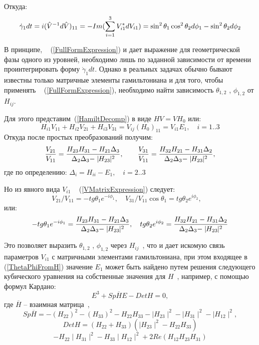 \documentclass[a4paper]{article}
\def\Vhat{ \ifmmode {\hat V} \else {$\hat V$} \fi}
\def\Vform{ \ifmmode {\Vhat^{-1}d\Vhat} \else {$\Vhat^{-1}d\Vhat$} \fi}
\def\cosT#1{\cos \theta_{#1}}
\def\mod#1{\mid\!\!#1\!\!\mid}
\begin{document}
Откуда:
\begin{equation}
  \dot \gamma_1 dt
   = i (\Vform)_{11}
   = - Im(\sum_{i=1}^{3} V^\ast_{i1} dV_{i1})
   = \sin^2\theta_1 \cos^2\theta_2 d\phi_1 -
                     \sin^2\theta_2 d\phi_2
  \label{FullFormExpression}
\end{equation}

В принципе, ~ (\ref{FullFormExpression}) и дает выражение для
геометрической фазы одного из уровней, необходимо лишь по заданной
зависимости \Vhat от времени проинтегрировать форму $\dot \gamma_1 dt$.
Однако в реальных
задачах обычно бывают известны только матричные элементы
гамильтониана и для того, чтобы применять ~ (\ref{FullFormExpression}),
необходимо найти зависимость $\theta_{1,2}$ , $\phi_{1,2}$ от $H_{ij}$.

Для этого представим~(\ref{HamiltDecomp}) в виде
$HV = VH_0$ или:
$$
  H_{i1}V_{11} + H_{i2}V_{21} + H_{i3}V_{31} = V_{ij}(H_0)_{11} = 
V_{i1}E_{1},
    \quad i = 1..3
$$
Откуда после простых преобразований получим:
$$
{V_{21} \over V_{11}} =
    {H_{23}H_{31} - H_{21} \Delta_3 \over \Delta_2 \Delta_3 - 
\mod{H_{23}}^2},
  \qquad
{V_{31} \over V_{11}} =
    {H_{32}H_{21} - H_{31} \Delta_2 \over \Delta_2 \Delta_3 - 
\mod{H_{23}}^2},
$$
где по определению: $\Delta_i = H_{ii} - E_1, \quad i = 2..3 $

Но из явного вида $V_{i1}$ ~ (\ref{VMatrixExpression}) следует:
$$
V_{21} / V_{11} = - tg \theta_1 e^{-i\phi_1}, \quad
V_{31} / V_{11} \cosT{1} = tg \theta_2 e^{i\phi_2}, \quad
$$
или:
\begin{equation}
- tg \theta_1 e^{-i\phi_1} =
    {H_{23}H_{31} - H_{21} \Delta_3 \over \Delta_2 \Delta_3 - 
\mod{H_{23}}^2},
\quad
tg \theta_2 e^{i\phi_2} =
    {H_{32}H_{21} - H_{31} \Delta_2 \over \Delta_2 \Delta_3 - 
\mod{H_{23}}^2}
\label{ThetaPhiFromH}
\end{equation}

Это позволяет выразить $\theta_{1,2}$ , $\phi_{1,2}$
через $H_{ij}$~, что и дает искомую
связь параметров $V_{i1}$ с матричными элементами гамильтониана,
при этом входящее в ~ (\ref{ThetaPhiFromH}) значение $E_1$
может быть найдено путем решения следующего кубического уравнения на
собственные значения для $H$~, например, с помощью формул Кардано:
\begin{equation}
    E^3 + Sp{\overline H}E - DetH = 0,
\label{SelfEquation}
\end{equation}
где ${\overline H}$ -- взаимная матрица~\cite{AboutMatrix},
$$
    Sp{\overline H} = - (H_{22})^2 - (H_{33})^2 - H_{22}H_{33}
     - \mod{H_{23}}^2 - \mod{H_{31}}^2 - \mod{H_{12}}^2,
$$
$$
    DetH = (H_{22} + H_{33})(\mod{H_{23}}^2 - H_{22}H_{33})
$$
$$
    - H_{22}\mod{H_{31}}^2 - H_{33}\mod{H_{12}}^2 + 2Re(H_{12}H_{23}H_{31})
$$
\end{document}
